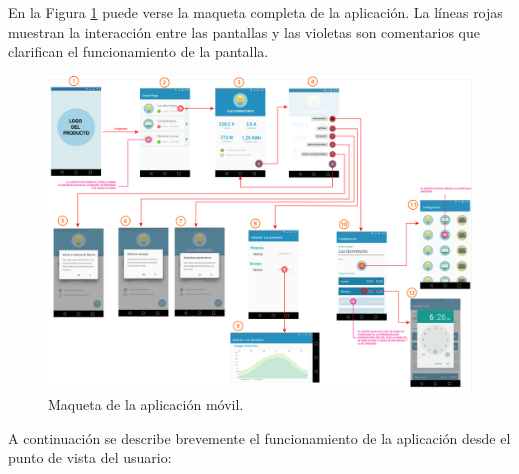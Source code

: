 En la Figura \ref{fig:app_wireframe} puede verse la maqueta completa de la aplicación. La líneas rojas muestran la interacción entre las pantallas y las violetas son comentarios que clarifican el funcionamiento de la pantalla.

\begin{figure}[h]
	\centering
	\includegraphics[width=18cm, angle=90]{./Figures/3_3_1_app_wireframe.png}
	\caption{Maqueta de la aplicación móvil.}
	\label{fig:app_wireframe}
\end{figure}

A continuación se describe brevemente el funcionamiento de la aplicación desde el punto de vista del usuario:

